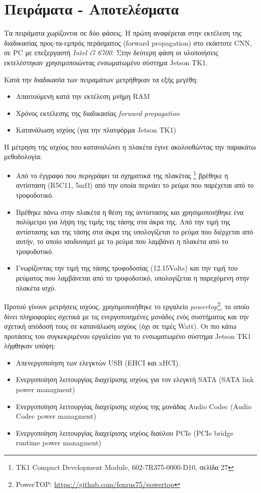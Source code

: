 \chapter{Πειράματα - Αποτελέσματα}
\label{chapter:experiments}

Τα πειράματα χωρίζονται σε δύο φάσεις. Η πρώτη αναφέρεται στην εκτέλεση
της διαδικασίας προς-τα-εμπρός περάσματος (forward propagation) στο εκάστοτε
CNN, σε PC με επεξεργαστή \emph{Intel i7 6700}.
Στην δεύτερη φάση οι υλοποιήσεις εκτελέστηκαν χρησιμοποιώντας
ενσωματωμένο σύστημα Jetson TK1.

Κατά την διαδικασία των πειραμάτων μετρήθηκαν τα εξής μεγέθη:
\begin{itemize}
  \item{Απαιτούμενη κατά την εκτέλεση μνήμη RAM}
  \item{Χρόνος εκτέλεσης της διαδικασίας \emph{forward propagation}}
  \item{Κατανάλωση ισχύος (για την πλατφόρμα Jetson TK1)}
\end{itemize}

Η μέτρηση της ισχύος που καταναλώνει η πλακέτα έγινε ακολουθώντας την παρακάτω μεθοδολογία:
\begin{itemize}
  \item{Από το έγγραφο που περιγράφει τα σχηματικά της πλακέτας \footnote{TK1 Compact Development Module,  602-7R375-0000-D10, σελίδα 27}
    βρέθηκε η αντίσταση (R5C11, 5mΩ) από την οποία περνάει το ρεύμα που παρέχεται από το τροφοδοτικό.}
  \item{Βρέθηκε πάνω στην πλακέτα η θέση της αντίστασης και χρησιμοποιήθηκε ένα
    πολύμετρο για λήψη της τιμής της τάσης στα άκρα της.
    Από την τιμή της αντίστασης και της τάσης στα άκρα της υπολογίζεται το ρεύμα που διέρχεται από αυτήν,
    το οποίο ισοδυναμεί με το ρεύμα που λαμβάνει η πλακέτα από το τροφοδοτικό.}
  \item{Γνωρίζοντας την τιμή της τάσης τροφοδοσίας (12.15Volts) και την τιμή
    του ρεύματος που λαμβάνεται από το τροφοδοτικό, υπολογίζεται η παρεχόμενη στην πλακέτα ισχύ.}
\end{itemize}

Προτού γίνουν μετρήσεις ισχύος, χρησιμοποιήθηκε το εργαλείο \emph{powertop}\footnote{PowerTOP: \url{https://github.com/fenrus75/powertop}},
το οποίο δίνει πληροφορίες σχετικά με τις ενεργοποιημένες μονάδες ενός συστήματος
και την σχετική απόδοσή τους σε κατανάλωση ισχύος (όχι σε τιμές Watt).
Οι πιο κάτω προτάσεις του συγκεκριμένου εργαλείου για το
ενσωματωμένο σύστημα Jetson TK1 λήφθηκαν υπόψη:
\begin{itemize}
  \item{Απενεργοποίηση των ελεγκτών USB (EHCI και xHCI).}
  \item{Ενεργοποίηση λειτουργίας διαχείρισης ισχύος για τον ελεγκτή SATA (SATA link power managment)}
  \item{Ενεργοποίηση λειτουργίας διαχείρισης ισχύος της μονάδας Audio Codec (Audio Codec power managment)}
  \item{Ενεργοποίηση λειτουργίας διαχείρισης ισχύος διαύλου PCIe (PCIe bridge runtime power managment)}
\end{itemize}

